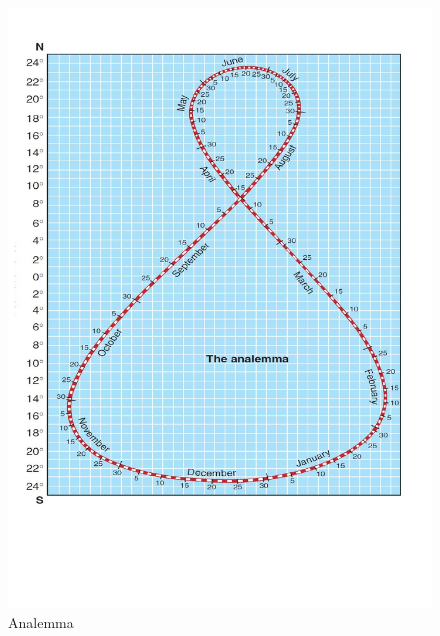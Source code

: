 \documentclass[12pt]{article}
\begin{document}
\begin{figure}[H]
	\center
  \includegraphics[scale=0.5]{Analemma.pdf}
 \caption{\label{Fig_Analemma} Analemma}
\end{figure}


~\newline
\end{document}
